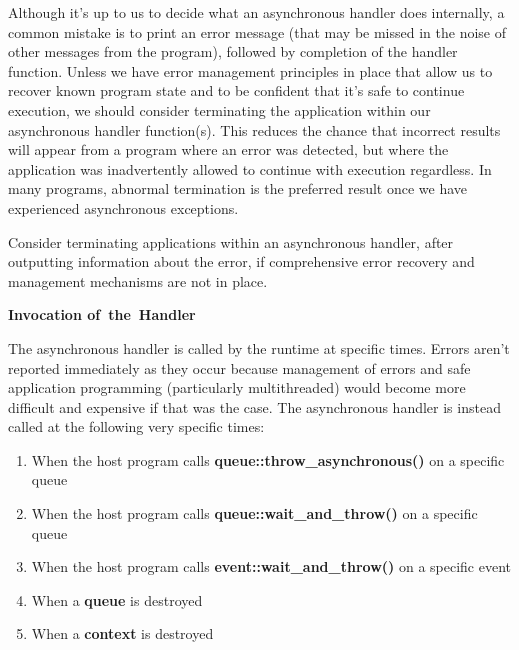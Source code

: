 Although it’s up to us to decide what an asynchronous handler does internally, a common mistake is to print an error message (that may be missed in the noise of other messages from the program), followed by completion of the handler function. Unless we have error management principles in place that allow us to recover known program state and to be confident that it’s safe to continue execution, we should consider terminating the application within our asynchronous handler function(s). This reduces the chance that incorrect results will appear from a program where an error was detected, but where the application was inadvertently allowed to continue with execution regardless. In many programs, abnormal termination is the preferred result once we have experienced asynchronous exceptions.\par

\begin{tcolorbox}[colback=red!5!white,colframe=red!75!black]
Consider terminating applications within an asynchronous handler, after outputting information about the error, if comprehensive error recovery and management mechanisms are not in place.
\end{tcolorbox}

\hspace*{\fill} \par %
\textbf{Invocation of the Handler}

The asynchronous handler is called by the runtime at specific times. Errors aren’t reported immediately as they occur because management of errors and safe application programming (particularly multithreaded) would become more difficult and expensive if that was the case. The asynchronous handler is instead called at the following very specific times:\par

\begin{enumerate}
	\item When the host program calls \textbf{queue::throw\_asynchronous()} on a specific queue
	\item When the host program calls \textbf{queue::wait\_and\_throw()} on a specific queue
	\item When the host program calls \textbf{event::wait\_and\_throw()} on a specific event
	\item When a \textbf{queue} is destroyed
	\item When a \textbf{context} is destroyed
\end{enumerate}


